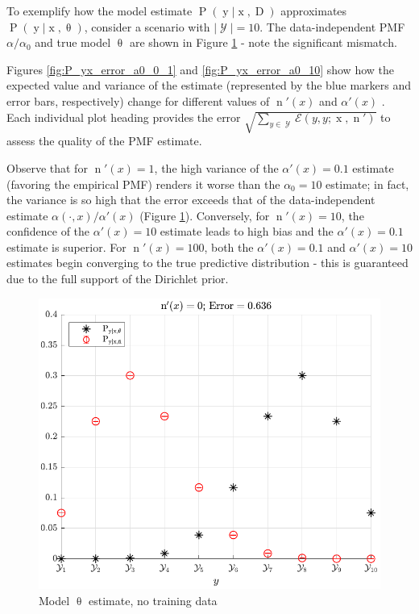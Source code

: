 \documentclass[conference]{IEEEtran}
\DeclareMathOperator{\xrm}{\mathrm{x}}
\DeclareMathOperator{\yrm}{\mathrm{y}}
\DeclareMathOperator{\Drm}{\mathrm{D}}
\DeclareMathOperator{\nrm}{\mathrm{n}}
\DeclareMathOperator{\Prm}{\mathrm{P}}
\DeclareMathOperator{\Ycal}{\mathcal{Y}}
\begin{document}
To exemplify how the model estimate $\Prm(\yrm | \xrm,\Drm)$ approximates $\Prm(\yrm | \xrm,\uptheta)$, consider a scenario with $|\Ycal| = 10$. The data-independent PMF $\alpha / \alpha_0$ and true model $\uptheta$ are shown in Figure \ref{fig:P_yx_error_N_0} - note the significant mismatch. 

Figures \ref{fig:P_yx_error_a0_0_1} and \ref{fig:P_yx_error_a0_10} show how the expected value and variance of the estimate (represented by the blue markers and error bars, respectively) change for different values of $\nrm'(x)$ and $\alpha'(x)$ . Each individual plot heading provides the error $\sqrt{\sum_{y \in \Ycal} \mathcal{E}(y,y ; \xrm,\nrm')}$ to assess the quality of the PMF estimate. 

Observe that for $\nrm'(x) = 1$, the high variance of the $\alpha'(x) = 0.1$ estimate (favoring the empirical PMF) renders it worse than the $\alpha_0 = 10$ estimate; in fact, the variance is so high that the error exceeds that of the data-independent estimate $\alpha(\cdot,x) / \alpha'(x)$ (Figure \ref{fig:P_yx_error_N_0}). Conversely, for $\nrm'(x) = 10$, the confidence of the $\alpha'(x) = 10$ estimate leads to high bias and the $\alpha'(x) = 0.1$ estimate is superior. For $\nrm'(x) = 100$, both the $\alpha'(x) = 0.1$ and $\alpha'(x) = 10$ estimates begin converging to the true predictive distribution - this is guaranteed due to the full support of the Dirichlet prior.


\begin{figure}
\centering
\includegraphics[width=1\linewidth]{P_yx_error_N_0.pdf}
\caption{Model $\uptheta$ estimate, no training data}
\label{fig:P_yx_error_N_0}
\end{figure}
\end{document}
